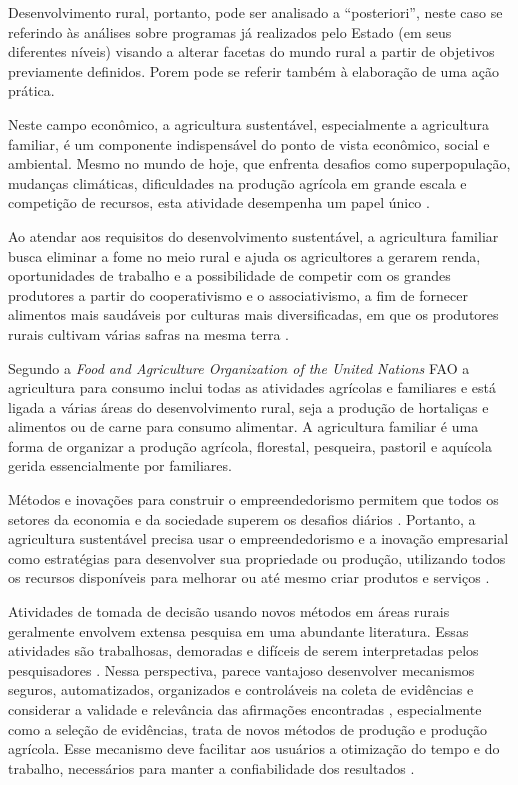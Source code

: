 \begin{citacao}
[...] Desenvolvimento rural, portanto, pode ser analisado a “posteriori”, neste caso se referindo às análises sobre programas já realizados pelo Estado (em seus diferentes níveis) visando a alterar facetas do mundo rural a partir de objetivos previamente definidos. Porem pode se referir também à elaboração de uma ação prática.
\end{citacao}


Neste campo econômico, a agricultura sustentável, especialmente a agricultura familiar, é um componente indispensável do ponto de vista econômico, social e ambiental. Mesmo no mundo de hoje, que enfrenta desafios como superpopulação, mudanças climáticas, dificuldades na produção agrícola em grande escala e competição de recursos, esta atividade desempenha um papel único \cite{Riegler2018,Rockstrom2017}.

Ao atendar aos requisitos do desenvolvimento sustentável, a agricultura familiar busca eliminar a fome no meio rural e ajuda os agricultores a gerarem renda, oportunidades de trabalho e a possibilidade de competir com os grandes produtores a partir do cooperativismo e o associativismo, a fim de fornecer alimentos mais saudáveis por culturas mais diversificadas, em que os produtores rurais cultivam várias safras na mesma terra \cite{Santana2014}.

Segundo a \textit{Food and Agriculture Organization of the United Nations} FAO \cite{FAO2017a} a agricultura para consumo inclui todas as atividades agrícolas e familiares e está ligada a várias áreas do desenvolvimento rural, seja a produção de hortaliças e alimentos ou de carne para consumo alimentar. A agricultura familiar é uma forma de organizar a produção agrícola, florestal, pesqueira, pastoril e aquícola gerida essencialmente por familiares.





Métodos e inovações para construir o empreendedorismo permitem que todos os setores da economia e da sociedade superem os desafios diários \cite{Cuellar-Galvez2018}. Portanto, a agricultura sustentável precisa usar o empreendedorismo e a inovação empresarial como estratégias para desenvolver sua propriedade ou produção, utilizando todos os recursos disponíveis para melhorar ou até mesmo criar produtos e serviços \cite{Julien2017}.

Atividades de tomada de decisão usando novos métodos em áreas rurais geralmente envolvem extensa pesquisa em uma abundante literatura. Essas atividades são trabalhosas, demoradas e difíceis de serem interpretadas pelos pesquisadores \cite{Xiao2019a}. Nessa perspectiva, parece vantajoso desenvolver mecanismos seguros, automatizados, organizados e controláveis na coleta de evidências e considerar a validade e relevância das afirmações encontradas \cite{Idri2018}, especialmente como a seleção de evidências, trata de novos métodos de produção e produção agrícola. Esse mecanismo deve facilitar aos usuários a otimização do tempo e do trabalho, necessários para manter a confiabilidade dos resultados \cite{Rockstrom2017}.

